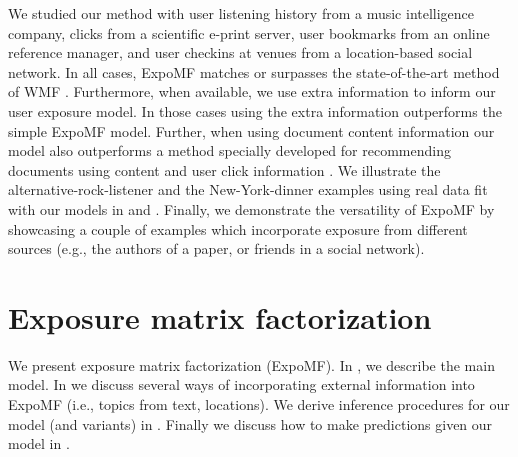 We studied our method with user listening history from a music intelligence company, clicks from a scientific e-print server, user
bookmarks from an online reference manager, and user checkins at venues from a 
location-based social network. In all cases, ExpoMF matches or surpasses
the state-of-the-art method of \gls{WMF} \citep{hu2008collaborative}. Furthermore, when
available, we use extra information to inform our user exposure model. In those
cases using the extra information outperforms the simple ExpoMF model.
Further, when using document content information our model also
outperforms a method specially developed for recommending documents using content and user click information 
\citep{wang2011collaborative}. We illustrate the
alternative-rock-listener and the New-York-dinner examples using real data fit 
with our models in  and . 
Finally, we demonstrate the versatility of ExpoMF by showcasing a couple of examples which incorporate exposure from different sources (e.g., the authors of a paper, or friends in a social network). 






\section{Exposure matrix factorization}\label{sec:model}

We present exposure matrix factorization (ExpoMF). 
In , we describe the main model. 
In  we discuss several ways 
of incorporating external information into ExpoMF (i.e., topics from text, locations). 
We derive inference procedures for our model (and variants) in . Finally we discuss how to make predictions given our model in .

